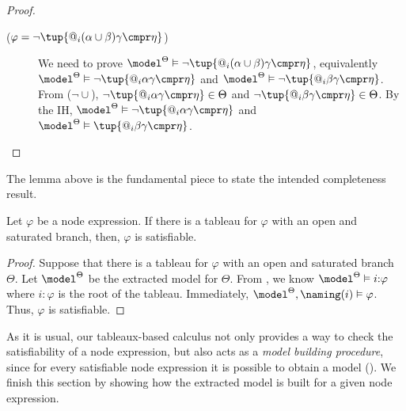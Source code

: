 \begin{proof}
\begin{description}
\begin{description}
            \item[($\varphi = \lnot\tup{@_i(\alpha \cup \beta) \gamma \cmpr \eta}$)]
                We need to prove  $\model^\Theta \vDash \lnot\tup{@_i (\alpha \cup \beta) \gamma \cmpr \eta}$, equivalently $\model^\Theta \vDash \lnot\tup{@_i\alpha\gamma \cmpr \eta}$ and $\model^\Theta \vDash \lnot\tup{@_i \beta\gamma \cmpr \eta}$.
                From (${\lnot}{\cup}$), $\lnot\tup{@_i\alpha\gamma \cmpr \eta} \in \Theta$ and $\lnot\tup{@_i\beta\gamma \cmpr \eta} \in \Theta$.
                By the IH, $\model^{\Theta} \vDash \lnot\tup{@_i\alpha\gamma \cmpr \eta}$ and $\model^{\Theta} \vDash \tup{@_i\beta\gamma \cmpr \eta}$.
        \end{description}

    \end{description}
\end{proof}

The lemma above is the fundamental piece to state the intended completeness result.

\begin{thm}[Completeness]
    Let $\varphi$ be a node expression.
    If there is a tableau for $\varphi$ with an open and saturated branch, then, $\varphi$ is satisfiable.
\end{thm}
\begin{proof}
    Suppose that there is a tableau for $\varphi$ with an open and saturated branch $\Theta$.
    Let $\model^{\Theta}$ be the extracted model for $\Theta$.
    From , we know $\model^{\Theta} \vDash i{:}\varphi$ where $i{:}\varphi$ is the root of the tableau.
    Immediately, $\model^{\Theta}, \naming(i) \vDash \varphi$.
    Thus, $\varphi$ is satisfiable.
\end{proof}

As it is usual, our tableaux-based calculus not only provides a way to check the satisfiability of a node expression, but also acts as a \emph{model building procedure}, since for every satisfiable node expression it is possible to obtain a model (). 
We finish this section by showing how the extracted model is built for a given node expression.

